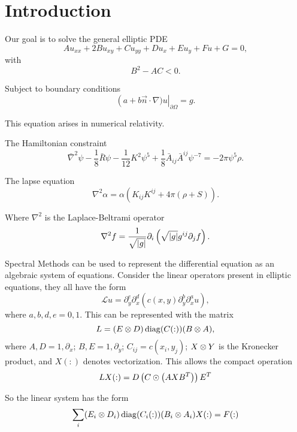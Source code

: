 \section{Introduction}
\begin{frame}{Our goal is to solve the general elliptic PDE}
\begin{equation*}
Au_{xx}+2Bu_{xy}+Cu_{yy}+Du_x+Eu_y+Fu+G=0,
\end{equation*}
with
\begin{equation*}
B^2-AC<0.
\end{equation*}

\bigskip
Subject to boundary conditions
\begin{equation*}
\left( a + b \vec{n}\cdot\nabla)u\right|_{\partial \Omega}=g.
\end{equation*}
\end{frame}

\begin{frame}{This equation arises in numerical relativity.}
	
The Hamiltonian constraint
\begin{equation*}
\bar{\nabla}^2 \psi - \frac{1}{8}\bar{R} \psi -\frac{1}{12} K^2 \psi^5 + \frac{1}{8}\bar{A}_{ij}\bar{A}^{ij}\psi^{-7}=-2\pi \psi^5 \rho.
\end{equation*}
	
The lapse equation
\begin{equation*}
\nabla^2 \alpha = \alpha \left(K_{ij}K^{ij}+4\pi\left(\rho+S\right)\right).
\end{equation*}

Where  $\nabla^2$ is the Laplace-Beltrami operator
\begin{equation*}
\nabla^2 f = \frac{1}{\sqrt{\abs{g}}} \partial_i \left( \sqrt{\abs{g}} g^{ij} \partial_j f \right).
\end{equation*}
\end{frame}

\begin{frame}{Spectral Methods can be used to represent the differential equation as an algebraic system of equations.}
Consider the linear operators present in elliptic equations, they all have the form
\begin{equation*}
\mathcal{L}u=\partial_y^{e} \partial_x^{d} \left(c(x,y)  \partial_y^{b} \partial_x^{a} u \right),
\end{equation*}
where $a,b,d,e=0,1$. This can be represented with the matrix
\begin{equation*}
L=(E\otimes D)\operatorname{diag}(C(:))(B\otimes A),
\end{equation*}
where $A,D=1,\partial_x$; $B,E=1,\partial_y$; $C_{ij}=c(x_i,y_j)$; $X\otimes Y$ is the Kronecker product, and $X(:)$ denotes vectorization. This allows the compact operation
\begin{equation*}
LX(:)=D\left(C\odot\left(AX{B}^{T}\right)\right){E}^{T}
\end{equation*}
\end{frame}

\begin{frame}{So the linear system has the form}
\begin{equation*}
\sum_{i} (E_i\otimes D_i)\operatorname{diag}(C_i(:))(B_i\otimes A_i) X(:) = F(:)
\end{equation*}
\end{frame}
